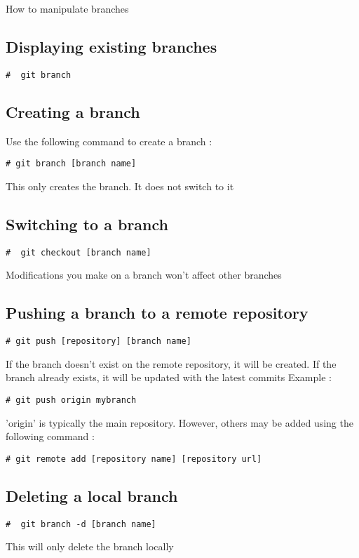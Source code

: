 \documentclass{article}
\begin{document}
How to manipulate branches

\subsection{Displaying existing branches}
\begin{lstlisting}[style=BashInputStyle]
    #  git branch
\end{lstlisting}

\subsection{Creating a branch}
Use the following command to create a branch :
\begin{lstlisting}[style=BashInputStyle]
    # git branch [branch name]
\end{lstlisting}
This only creates the branch. It does not switch to it

\subsection{Switching to a branch}
\begin{lstlisting}[style=BashInputStyle]
    #  git checkout [branch name]
\end{lstlisting}
Modifications you make on a branch won't affect other branches

\subsection{Pushing a branch to a remote repository}
\begin{lstlisting}[style=BashInputStyle]
    # git push [repository] [branch name]
\end{lstlisting}
If the branch doesn't exist on the remote repository, it will be created.
If the branch already exists, it will be updated with the latest commits
Example :
\begin{lstlisting}[style=BashInputStyle]
    # git push origin mybranch
\end{lstlisting}
'origin' is typically the main repository. However, others may be added using the following command :
\begin{lstlisting}[style=BashInputStyle]
    # git remote add [repository name] [repository url]
\end{lstlisting}

\subsection{Deleting a local branch}
\begin{lstlisting}[style=BashInputStyle]
    #  git branch -d [branch name]
\end{lstlisting}
This will only delete the branch locally
\end{document}
